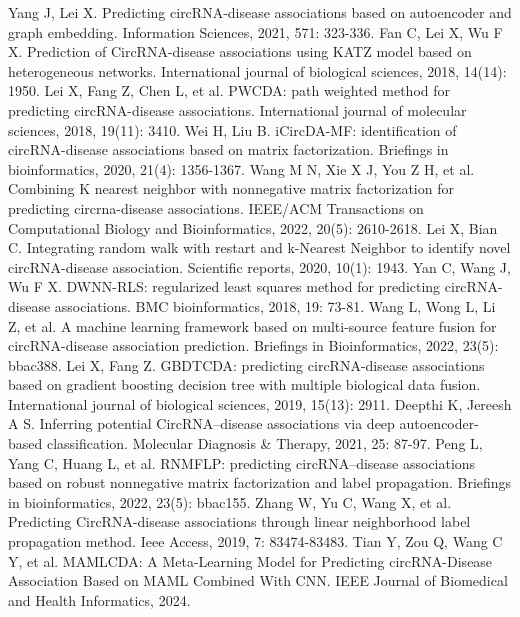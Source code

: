 \documentclass{bioinfo}
\begin{document}
\begin{thebibliography}{}
%
Yang J, Lei X. Predicting circRNA-disease associations based on autoencoder and graph embedding. Information Sciences, 2021, 571: 323-336.
Fan C, Lei X, Wu F X. Prediction of CircRNA-disease associations using KATZ model based on heterogeneous networks. International journal of biological sciences, 2018, 14(14): 1950.
Lei X, Fang Z, Chen L, et al. PWCDA: path weighted method for predicting circRNA-disease associations. International journal of molecular sciences, 2018, 19(11): 3410.
Wei H, Liu B. iCircDA-MF: identification of circRNA-disease associations based on matrix factorization. Briefings in bioinformatics, 2020, 21(4): 1356-1367.
Wang M N, Xie X J, You Z H, et al. Combining K nearest neighbor with nonnegative matrix factorization for predicting circrna-disease associations. IEEE/ACM Transactions on Computational Biology and Bioinformatics, 2022, 20(5): 2610-2618.
%
Lei X, Bian C. Integrating random walk with restart and k-Nearest Neighbor to identify novel circRNA-disease association. Scientific reports, 2020, 10(1): 1943.
Yan C, Wang J, Wu F X. DWNN-RLS: regularized least squares method for predicting circRNA-disease associations. BMC bioinformatics, 2018, 19: 73-81.
Wang L, Wong L, Li Z, et al. A machine learning framework based on multi-source feature fusion for circRNA-disease association prediction. Briefings in Bioinformatics, 2022, 23(5): bbac388.
Lei X, Fang Z. GBDTCDA: predicting circRNA-disease associations based on gradient boosting decision tree with multiple biological data fusion. International journal of biological sciences, 2019, 15(13): 2911.
%
Deepthi K, Jereesh A S. Inferring potential CircRNA–disease associations via deep autoencoder-based classification. Molecular Diagnosis \& Therapy, 2021, 25: 87-97.
Peng L, Yang C, Huang L, et al. RNMFLP: predicting circRNA–disease associations based on robust nonnegative matrix factorization and label propagation. Briefings in bioinformatics, 2022, 23(5): bbac155.
%
Zhang W, Yu C, Wang X, et al. Predicting CircRNA-disease associations through linear neighborhood label propagation method. Ieee Access, 2019, 7: 83474-83483.
%
Tian Y, Zou Q, Wang C Y, et al. MAMLCDA: A Meta-Learning Model for Predicting circRNA-Disease Association Based on MAML Combined With CNN. IEEE Journal of Biomedical and Health Informatics, 2024.

\end{thebibliography}
\end{document}
